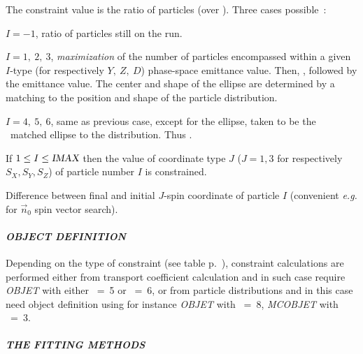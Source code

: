 \smallskip

 The constraint value  is the ratio of particles (over \IMAX). Three cases possible~: 

     $I=-1$,  ratio of particles still on the run. 

    $I =1, ~ 2, ~ 3$,   \textsl{maximization} of the number of particles 
 encompassed within a given $I$-type 
(for respectively $Y,~Z,~D$) phase-space emittance value. Then, , followed by the emittance value. 
The center and shape of the ellipse are  
 determined by a  matching to  the position and shape of the particle distribution. 

     $I =4, ~ 5, ~ 6$,  same as previous case, except for the ellipse, taken to be the \rms\ matched ellipse 
to the distribution. Thus .

\smallskip

 If $1\leq I\leq \textsl{IMAX}$ then the value of coordinate type $J$ ($J=1,3$ for respectively 
 $S_X, S_Y, S_Z$) of particle number $I$ is constrained.  

\smallskip

 Difference between final and initial $J$-spin coordinate  of particle $I$ (convenient 
\emph{e.g.} for $\vec n_0$ spin vector search).   





\paragraph{\textit{OBJECT DEFINITION}}


\noindent Depending on the type of constraint (see table p.~\pageref{TabFITZlst1}), constraint calculations are performed either from 
transport coefficient calculation and in such case require  \textsl{OBJET} with either \KOBJ~=~5  
or  \KOBJ~=~6, or from particle distributions and in this case need  object definition using for 
instance \textsl{OBJET} with \KOBJ~=~8,    \textsl{MCOBJET} with  \KOBJ~=~3. 



\smallskip

\paragraph{\textit{THE FITTING METHODS }}    %


